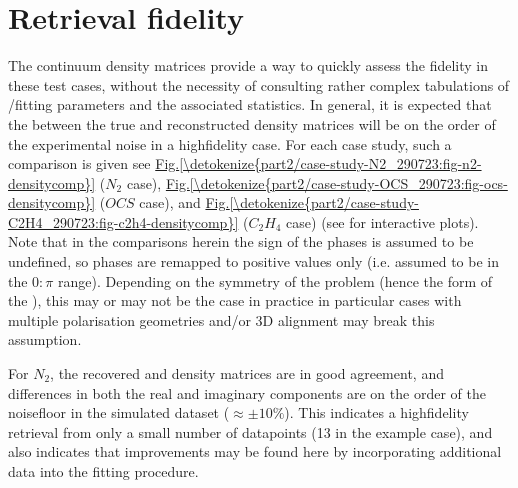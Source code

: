 \documentclass[letterpaper,table,10pt,english]{jupyterBook}
\begin{document}
\section{Retrieval fidelity}
\label{\detokenize{part2/case-study-summaries_240723:retrieval-fidelity}}
\sphinxAtStartPar
The continuum density matrices provide a way to quickly assess the {\hyperref[\detokenize{backmatter/glossary:term-bootstrap-retrieval-protocol}]{}} fidelity in these test cases, without the necessity of consulting rather complex tabulations of {\hyperref[\detokenize{backmatter/glossary:term-radial-matrix-elements}]{}}/fitting parameters and the associated statistics. In general, it is expected that the  between the true and reconstructed density matrices will be on the order of the experimental noise in a high\sphinxhyphen{}fidelity case. For each case study, such a comparison is given \sphinxhyphen{} see \hyperref[\detokenize{part2/case-study-N2_290723:fig-n2-densitycomp}]{Fig.\@ \ref{\detokenize{part2/case-study-N2_290723:fig-n2-densitycomp}}} (\(N_2\) case), \hyperref[\detokenize{part2/case-study-OCS_290723:fig-ocs-densitycomp}]{Fig.\@ \ref{\detokenize{part2/case-study-OCS_290723:fig-ocs-densitycomp}}} (\(OCS\) case), and \hyperref[\detokenize{part2/case-study-C2H4_290723:fig-c2h4-densitycomp}]{Fig.\@ \ref{\detokenize{part2/case-study-C2H4_290723:fig-c2h4-densitycomp}}} (\(C_2H_4\) case) (see  for interactive plots). Note that in the comparisons herein the sign of the phases is assumed to be undefined, so phases are remapped to positive values only (i.e. assumed to be in the \(0:\pi\) range). Depending on the symmetry of the problem (hence the form of the {\hyperref[\detokenize{backmatter/glossary:term-channel-functions}]{}}), this may or may not be the case in practice \sphinxhyphen{} in particular cases with multiple polarisation geometries and/or 3D alignment may break this assumption.

\sphinxAtStartPar
For \(N_2\), the recovered and density matrices are in good agreement, and differences in both the real and imaginary components are on the order of the noise\sphinxhyphen{}floor in the simulated dataset (\(\approx\pm10\%\)). This indicates a high\sphinxhyphen{}fidelity retrieval from only a small number of data\sphinxhyphen{}points (13 in the example case), and also indicates that improvements may be found here by incorporating additional data into the fitting procedure.
\end{document}

